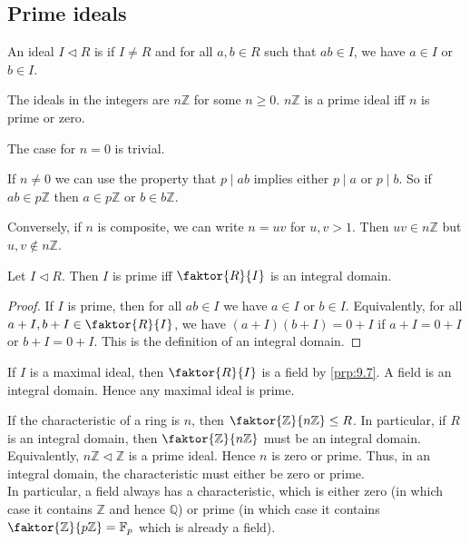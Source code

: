 \subsection{Prime ideals}
\begin{definition}
	An ideal $I \triangleleft R$ is  if $I \neq R$ and for all $a,b \in R$ such that $ab \in I$, we have $a \in I$ or $b \in I$.
\end{definition}

\begin{example}
	The ideals in the integers are $n \mathbb{Z}$ for some $n \geq 0$.
	$n\mathbb Z$ is a prime ideal iff $n$ is prime or zero.

	The case for $n = 0$ is trivial.

	If $n \neq 0$ we can use the property that $p \mid ab$ implies either $p \mid a$ or $p \mid b$.
	So if $ab \in p \mathbb{Z}$ then $a \in p \mathbb{Z}$ or $b \in b \mathbb{Z}$.

	Conversely, if $n$ is composite, we can write $n = uv$ for $u, v > 1$.
	Then $uv \in n\mathbb Z$ but $u,v \not\in n\mathbb Z$.
\end{example}

\begin{proposition} \label{prp:9.8}
	Let $I \triangleleft R$.
	Then $I$ is prime iff $\faktor{R}{I}$ is an integral domain.
\end{proposition}

\begin{proof}
	If $I$ is prime, then for all $ab \in I$ we have $a \in I$ or $b \in I$.
	Equivalently, for all $a + I, b + I \in \faktor{R}{I}$, we have $(a+I)(b+I) = 0+I$ if $a+I = 0+I$ or $b+I = 0+I$.
	This is the definition of an integral domain.
\end{proof}

\begin{remark}
	If $I$ is a maximal ideal, then $\faktor{R}{I}$ is a field by \cref{prp:9.7}.
	A field is an integral domain.
	Hence any maximal ideal is prime.
\end{remark}

\begin{remark}
	If the characteristic of a ring is $n$, then $\faktor{\mathbb Z}{n\mathbb Z} \leq R$.
	In particular, if $R$ is an integral domain, then $\faktor{\mathbb Z}{n\mathbb Z}$ must be an integral domain.
	Equivalently, $n\mathbb Z \triangleleft \mathbb Z$ is a prime ideal.
	Hence $n$ is zero or prime.
	Thus, in an integral domain, the characteristic must either be zero or prime. \\
	In particular, a field always has a characteristic, which is either zero (in which case it contains $\mathbb Z$ and hence $\mathbb Q$) or prime (in which case it contains $\faktor{\mathbb Z}{p\mathbb Z} = \mathbb F_p$ which is already a field).
\end{remark}
